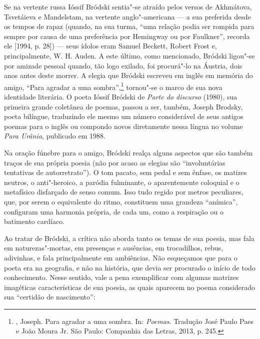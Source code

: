 Se na vertente russa Ióssif Bródski sentia"-se atraído pelos versos de
Akhmátova, Tsvetáieva e Mandelstam, na vertente anglo"-americana --- a sua
preferida desde os tempos de rapaz (quando, na sua turma,
``uma relação podia ser rompida para sempre por causa de uma preferência
por Hemingway ou por Faulkner'', recorda ele [1994, p. 28]) --- seus ídolos eram Samuel
Beckett, Robert Frost e, principalmente, W. H. Auden. A este último, como mencionado, Bródski
ligou"-se por amizade pessoal quando, tão logo exilado, foi procurá"-lo
na Áustria, dois anos antes deste morrer. A
elegia que Bródski escreveu em inglês em memória do amigo, ``Para
agradar a uma sombra'',\footnote{, Joseph. Para agradar a uma sombra.
 In:  \emph{Poemas}. Tradução José Paulo Paes e 
João Moura Jr. São Paulo: Companhia das Letras, 2013, p. 245.} tornou"-se o marco de sua nova identidade
literária. O poeta Ióssif Bródski de \emph{Parte do discurso} (1980), sua primeira grande coletânea de poemas, passou a ser,
também, Joseph Brodsky, poeta bilíngue, traduzindo ele mesmo um
número considerável de seus antigos poemas para o inglês ou compondo
novos diretamente nessa língua no volume \emph{Para Urânia},
publicado em 1988.

Na oração fúnebre para o amigo, Bródski realça alguns
aspectos que são também traços de sua própria poesia (não por acaso as elegias são
``involuntárias tentativas de autorretrato''). O tom pacato,
sem pedal e sem ênfase, os matizes neutros, o anti"-heroico, a paródia
fulminante, o aparentemente coloquial e o metafísico disfarçado de senso
comum. Isso tudo regido por metros peculiares, que, por serem o
equivalente do ritmo, constituem uma grandeza ``anímica'', configuram uma
harmonia própria, de cada um, como a respiração ou o batimento cardíaco.

Ao tratar de Bródski, a crítica não aborda tanto os temas de sua poesia, mas
fala em naturezas"-mortas, em presenças e ausências, em trocadilhos, rebus, adivinhas, e fala
principalmente em ambiências. Não esqueçamos que para o poeta era na
geografia, e não na história, que devia ser procurado o início de todo
conhecimento. Nesse sentido, vale a pena exemplificar com algumas
matrizes imagéticas características de sua poesia, as quais aparecem no poema
considerado sua ``certidão de nascimento'':


